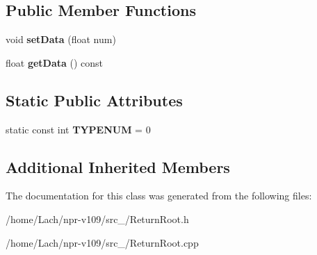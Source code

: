 \subsection*{Public Member Functions}
\begin{DoxyCompactItemize}
\item 
\hypertarget{classReturnRoot_aee0234acc3e276cee21e7acd2e51f4b9}{}\label{classReturnRoot_aee0234acc3e276cee21e7acd2e51f4b9} 
void {\bfseries set\+Data} (float num)
\item 
\hypertarget{classReturnRoot_a06ff8a09e17401fc2aff09d20211e5c9}{}\label{classReturnRoot_a06ff8a09e17401fc2aff09d20211e5c9} 
float {\bfseries get\+Data} () const
\end{DoxyCompactItemize}
\subsection*{Static Public Attributes}
\begin{DoxyCompactItemize}
\item 
\hypertarget{classReturnRoot_af8b144313269a7cc5475dcc8c3b69da4}{}\label{classReturnRoot_af8b144313269a7cc5475dcc8c3b69da4} 
static const int {\bfseries T\+Y\+P\+E\+N\+UM} = 0
\end{DoxyCompactItemize}
\subsection*{Additional Inherited Members}


The documentation for this class was generated from the following files\+:\begin{DoxyCompactItemize}
\item 
/home/\+Lach/npr-\/v109/src\+\_/Return\+Root.\+h\item 
/home/\+Lach/npr-\/v109/src\+\_/Return\+Root.\+cpp\end{DoxyCompactItemize}
